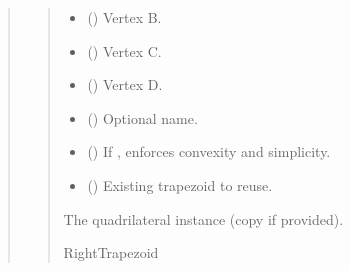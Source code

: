 \documentclass[letterpaper,10pt,english]{sphinxmanual}
\begin{document}
\begin{quote}
\begin{fulllineitems}
\begin{fulllineitems}
\begin{quote}
\begin{description}
\begin{itemize}
\item {} 
\sphinxAtStartPar
{} (\sphinxstyleliteralemphasis{\sphinxupquote{ | }}) \textendash{} Vertex B.

\item {} 
\sphinxAtStartPar
{} (\sphinxstyleliteralemphasis{\sphinxupquote{ | }}) \textendash{} Vertex C.

\item {} 
\sphinxAtStartPar
{} (\sphinxstyleliteralemphasis{\sphinxupquote{ | }}) \textendash{} Vertex D.

\item {} 
\sphinxAtStartPar
{} (\sphinxstyleliteralemphasis{\sphinxupquote{ | }}) \textendash{} Optional name.

\item {} 
\sphinxAtStartPar
{} () \textendash{} If , enforces convexity and simplicity.

\item {} 
\sphinxAtStartPar
{} (\sphinxstyleliteralemphasis{\sphinxupquote{ | }}) \textendash{} Existing trapezoid to reuse.

\end{itemize}

\sphinxAtStartPar
The quadrilateral instance (copy if provided).

\sphinxAtStartPar
RightTrapezoid

\end{description}\end{quote}

\end{fulllineitems}



\end{fulllineitems}
\end{quote}
\end{document}
